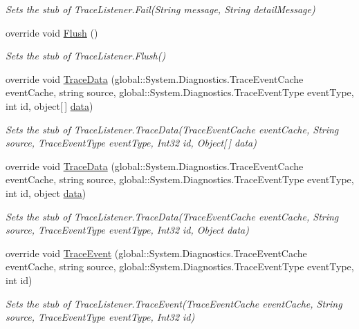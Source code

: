 \begin{DoxyCompactItemize}
\begin{DoxyCompactList}\small\item\em Sets the stub of Trace\-Listener.\-Fail(\-String message, String detail\-Message)\end{DoxyCompactList}\item 
override void \hyperlink{class_system_1_1_diagnostics_1_1_fakes_1_1_stub_trace_listener_a8850014bf2185b7428cb176812f11729}{Flush} ()
\begin{DoxyCompactList}\small\item\em Sets the stub of Trace\-Listener.\-Flush()\end{DoxyCompactList}\item 
override void \hyperlink{class_system_1_1_diagnostics_1_1_fakes_1_1_stub_trace_listener_a4a844ac30785d9541ca5d686ed6925cb}{Trace\-Data} (global\-::\-System.\-Diagnostics.\-Trace\-Event\-Cache event\-Cache, string source, global\-::\-System.\-Diagnostics.\-Trace\-Event\-Type event\-Type, int id, object\mbox{[}$\,$\mbox{]} \hyperlink{jquery-1_810_82-vsdoc_8js_a609407b3456fdc3c5671a9fc4a226ff7}{data})
\begin{DoxyCompactList}\small\item\em Sets the stub of Trace\-Listener.\-Trace\-Data(\-Trace\-Event\-Cache event\-Cache, String source, Trace\-Event\-Type event\-Type, Int32 id, Object\mbox{[}$\,$\mbox{]} data)\end{DoxyCompactList}\item 
override void \hyperlink{class_system_1_1_diagnostics_1_1_fakes_1_1_stub_trace_listener_a6ed2e6dd52f62107b9a4cf9a9629c199}{Trace\-Data} (global\-::\-System.\-Diagnostics.\-Trace\-Event\-Cache event\-Cache, string source, global\-::\-System.\-Diagnostics.\-Trace\-Event\-Type event\-Type, int id, object \hyperlink{jquery-1_810_82-vsdoc_8js_a609407b3456fdc3c5671a9fc4a226ff7}{data})
\begin{DoxyCompactList}\small\item\em Sets the stub of Trace\-Listener.\-Trace\-Data(\-Trace\-Event\-Cache event\-Cache, String source, Trace\-Event\-Type event\-Type, Int32 id, Object data)\end{DoxyCompactList}\item 
override void \hyperlink{class_system_1_1_diagnostics_1_1_fakes_1_1_stub_trace_listener_a7dbe4b69789e7f2074e55096b9e08365}{Trace\-Event} (global\-::\-System.\-Diagnostics.\-Trace\-Event\-Cache event\-Cache, string source, global\-::\-System.\-Diagnostics.\-Trace\-Event\-Type event\-Type, int id)
\begin{DoxyCompactList}\small\item\em Sets the stub of Trace\-Listener.\-Trace\-Event(\-Trace\-Event\-Cache event\-Cache, String source, Trace\-Event\-Type event\-Type, Int32 id)\end{DoxyCompactList}\item 

\end{DoxyCompactItemize}
